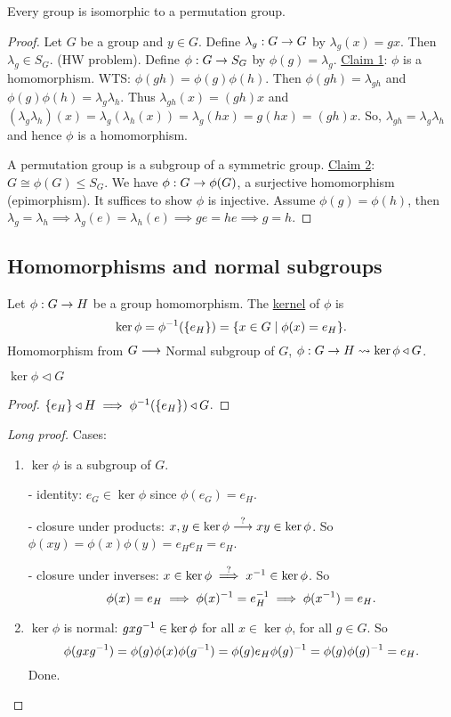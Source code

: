 \documentclass[]{article}
\begin{document}
\begin{theorem}
	Every group is isomorphic to a permutation group.
\end{theorem}
\begin{proof}
	Let $G$ be a group and $y\in G$. Define $\lambda_g:G\rightarrow G$ by $\lambda_g(x) = gx$.
	Then $\lambda_g\in S_G$. (HW problem).
	Define $\phi:G\rightarrow S_G$ by $\phi(g) = \lambda_g$.
	\ul{Claim 1}: $\phi$ is a homomorphism. WTS: $\phi(gh) = \phi(g)\phi(h)$.
	Then $\phi(gh) = \lambda_{gh}$ and $\phi(g)\phi(h) = \lambda_g\lambda_h$.
	Thus $\lambda_{gh}(x) = (gh)x$ and $(\lambda_g\lambda_h)(x) = \lambda_g(\lambda_h(x)) = \lambda_g(hx) = g(hx) = (gh)x$.
	So, $\lambda_{gh} = \lambda_g\lambda_h$ and hence $\phi$ is a homomorphism.

	A permutation group is a subgroup of a symmetric group.
	\ul{Claim 2}: $G\cong\phi(G)\leq S_G$.
	We have $\phi:G\rightarrow\phi(G)$, a surjective homomorphism (epimorphism).
	It suffices to show $\phi$ is injective.
	Assume $\phi(g) = \phi(h)$, then $\lambda_g = \lambda_h \implies \lambda_g(e) = \lambda_h(e) \implies ge = he \implies g = h$.
\end{proof}

\subsection{Homomorphisms and normal subgroups}

\begin{definition}
	Let $\phi:G\rightarrow H$ be a group homomorphism. The \ul{kernel} of $\phi$ is $$\ker\phi = \phi^{-1}(\{e_H\}) = \{x\in G\mid\phi(x)=e_H\}.$$
	Homomorphism from $G\longrightarrow $ Normal subgroup of $G$, $\phi:G\rightarrow H\rightsquigarrow \ker\phi\triangleleft G$.
\end{definition}
\begin{theorem}
	$\ker\phi\triangleleft G$
\end{theorem}
\begin{proof}
	$\{e_H\}\triangleleft H\implies \phi^{-1}(\{e_H\})\triangleleft G$.
\end{proof}
\begin{proof}
	[Long proof] Cases:
	\begin{enumerate}
		\item $\ker\phi$ is a subgroup of $G$.

			- identity: 
			$e_G\in\ker\phi$ since $\phi(e_G)=e_H$.

			- closure under products:
			$x,y\in\ker\phi\overset{?}{\longrightarrow}xy\in\ker\phi$.
			So $\phi(xy)=\phi(x)\phi(y)=e_He_H=e_H$.

			- closure under inverses:
			$x\in\ker\phi\overset{?}{\implies}x^{-1}\in\ker\phi$.
			So $$\phi(x)=e_H\implies \phi(x)^{-1} = e_H^{-1} \implies \phi(x^{-1}) = e_H.$$
		
		\item $\ker\phi$ is normal:
			$gxg^{-1}\in\ker\phi$ for all $x\in\ker\phi$, for all $g\in G$.
			So \[\phi(gxg^{-1}) = \phi(g)\phi(x)\phi(g^{-1}) = \phi(g)e_H\phi(g)^{-1} = \phi(g)\phi(g)^{-1} = e_H.\]
			Done.
	\end{enumerate}
\end{proof}
\end{document}
